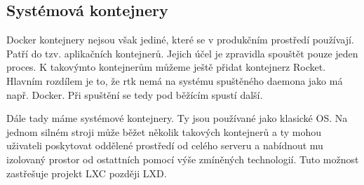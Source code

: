 
\subsection{Systémová kontejnery}

Docker kontejnery nejsou však jediné, které se v produkčním prostředí používají. Patří do tzv. aplikačních kontejnerů. Jejich účel je zpravidla spouštět pouze jeden proces. K takovýmto kontejnerům můžeme ještě přidat kontejnerz Rocket. Hlavním rozdílem je to, že rtk nemá na systému spuštěného daemona jako má např. Docker. Při spuštění se tedy pod běžícím spustí další. 

Dále tady máme systémové kontejnery. Ty jsou používané jako klasické OS. Na jednom silném stroji může běžet několik takových kontejnerů a ty mohou uživateli poskytovat oddělené prostředí od celého serveru a nabídnout mu izolovaný prostor od ostattních pomocí výše zmíněných technologií. Tuto možnost zastřešuje projekt LXC později LXD.

